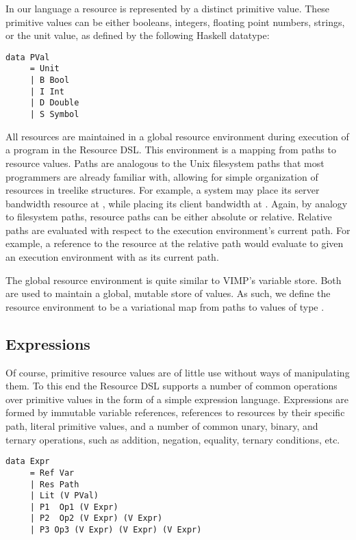 \documentclass[12pt,oneside]{book}
\begin{document}
In our language a resource is represented by a distinct primitive value. These primitive values
can be either booleans, integers, floating point numbers, strings, or the unit value, as defined
by the following Haskell datatype:

\begin{lstlisting}
data PVal
     = Unit
     | B Bool
     | I Int
     | D Double
     | S Symbol
\end{lstlisting}

All resources are maintained in a global resource environment during execution of a program
in the Resource DSL. This environment is a mapping from paths to resource values. Paths are
analogous to the Unix filesystem paths that most programmers are already familiar with, allowing for
simple organization of resources in treelike structures. For example, a system may place its server
bandwidth resource at , while placing its client bandwidth at .
Again, by analogy to filesystem paths, resource paths can be either absolute or relative. Relative paths are
evaluated with respect to the execution environment's current path. For example, a reference to the resource
at the relative path  would evaluate to 
given an execution environment with  as its current path.

The global resource environment is quite similar to VIMP's variable store. Both are used to maintain
a global, mutable store of values. As such, we define the resource environment to be a variational map
from paths to values of type .

\subsection{Expressions}

Of course, primitive resource values are of little use without ways of manipulating them. To this end the Resource DSL supports
a number of common operations over primitive values in the form of a simple expression language. Expressions are formed by
immutable variable references, references to resources by their specific path, literal primitive values, and a number of common unary, binary, and ternary
operations, such as addition, negation, equality, ternary conditions, etc.

\begin{lstlisting}
data Expr
     = Ref Var    
     | Res Path                            
     | Lit (V PVal)           
     | P1  Op1 (V Expr)                    
     | P2  Op2 (V Expr) (V Expr)
     | P3 Op3 (V Expr) (V Expr) (V Expr)
\end{lstlisting}
\end{document}
